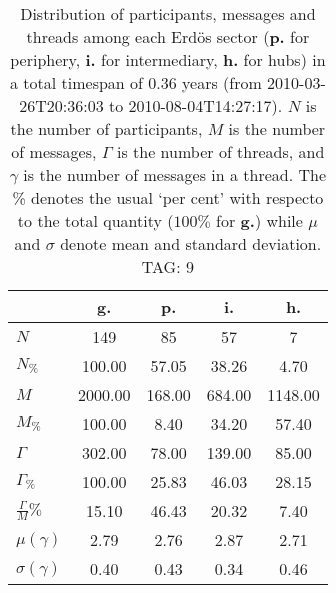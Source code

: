 \begin{table}[h!]
\begin{center}
\begin{tabular}{| l || c | c | c | c |}\hline
 & {\bf g.} & {\bf p.} & {\bf i.} & {\bf h.} \\\hline\hline
$N$ & 149  & 85  & 57  & 7 \\
$N_{\%}$ & 100.00  & 57.05  & 38.26  & 4.70 \\\hline
$M$ & 2000.00  & 168.00  & 684.00  & 1148.00 \\
$M_{\%}$ & 100.00  & 8.40  & 34.20  & 57.40 \\\hline
$\Gamma$ & 302.00  & 78.00  & 139.00  & 85.00 \\
$\Gamma_{\%}$ & 100.00  & 25.83  & 46.03  & 28.15 \\\hline
$\frac{\Gamma}{M}\%$ & 15.10  & 46.43  & 20.32  & 7.40 \\
$\mu(\gamma)$ & 2.79  & 2.76  & 2.87  & 2.71 \\
$\sigma(\gamma)$ & 0.40  & 0.43  & 0.34  & 0.46 \\\hline
\end{tabular}
\caption{Distribution of participants, messages and threads among each Erd\"os sector ({\bf p.} for periphery, {\bf i.} for intermediary, 
    {\bf h.} for hubs) in a total timespan of 0.36 years (from 2010-03-26T20:36:03 to 2010-08-04T14:27:17). $N$ is the number of participants, $M$ is the number of messages, $\Gamma$ is the number of threads, and $\gamma$ is the number of messages in a thread.
    The \% denotes the usual `per cent' with respecto to the total quantity ($100\%$ for {\bf g.})
    while $\mu$ and $\sigma$ denote mean and standard deviation. TAG: 9}
\end{center}
\end{table}